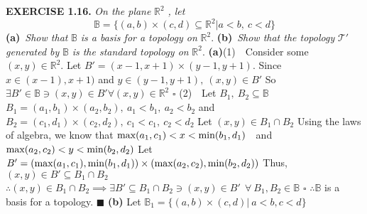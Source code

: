 \documentclass[12pt]{article}
\begin{document}
	\newpage
	\noindent
  \textbf{EXERCISE 1.16.} \textit{On the plane} \(\mathbb{R}^2\) \textit{, let}
	\[\mathbb{B}=\{(a,b)\times (c,d) \subseteq \mathbb{R}^2 | a<b,\ c<d\}\]
	\textbf{(a)}\ \textit{Show that} \(\mathbb{B}\) \textit{is a basis for a topology on} \(\mathbb{R}^2\). \newline
	\textbf{(b)}\ \textit{Show that the topology} \(\mathcal{T}'\) \textit{generated by} \(\mathbb{B}\) \textit{is the standard topology on} \(\mathbb{R}^2\).
	\newline \newline
	\textbf{(a)}\newline (1)\ \ Consider some \((x,y) \in \mathbb{R}^2\). \newline
	Let \(B'=(x-1 , x+1) \times (y-1, y+1)\). \newline
	Since \(x \in (x-1) , x+1)\) and \(y \in (y-1, y+1),\ (x,y) \in B'\) \newline
	So \(\exists B' \in \mathbb{B} \ni (x,y) \in B' \forall (x,y) \in \mathbb{R}^2\)
	\newline \(\square\) \newline
	(2)\ \ Let \(B_1,\ B_2 \subseteq \mathbb{B}\) \newline
	\(B_1 = (a_1, b_1) \times (a_2, b_2),\ a_1 < b_1,\ a_2 < b_2\) and \(B_2 = (c_1, d_1) \times (c_2, d_2),\ c_1 < c_1,\ c_2 < d_2\)
	\newline
	Let \((x,y) \in B_1 \cap B_2\) \newline
	Using the laws of algebra, we know that \newline
	\(\textup{max}(a_1, c_1)< x < \textup{min}(b_1, d_1)\)\ \  and\ \  \(\textup{max}(a_2, c_2) < y < \textup{min}(b_2, d_2)\)
	\newline \newline
	Let \(B'= (\textup{max}(a_1, c_1), \textup{min}(b_1, d_1)) \times (\textup{max}(a_2, c_2), \textup{min}(b_2, d_2))\)
	\newline
	Thus, \((x,y) \in B' \subseteq B_1 \cap B_2\) \newline
	\(\therefore (x,y) \in B_1 \cap B_2 \implies \exists B' \subseteq B_1 \cap B_2 \ni (x,y) \in B'\ \ \forall\  B_1,B_2\in\mathbb{B}\)
	\newline \(\square\) \newline
	\(\therefore \mathbb{B}\) is a basis for a topology.
	\newline \(\blacksquare\) \newline
	\newpage
	\noindent
	\textbf{(b)}\newline
	Let \(\mathbb{B}_1 = \{(a,b)\times (c,d) |\ a<b, c<d\}\) \newline
\end{document}
